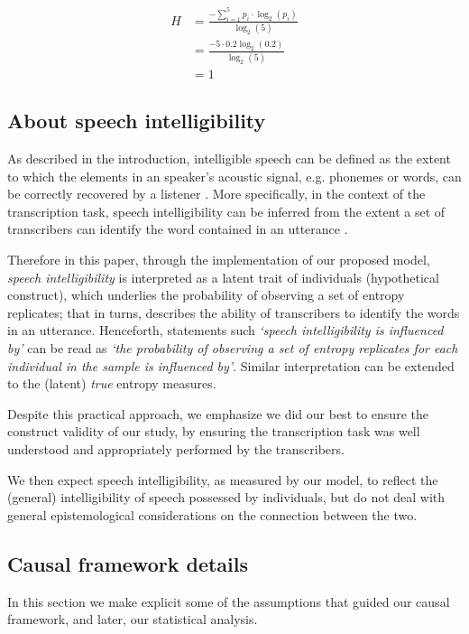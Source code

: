 %
\begin{align*}
	H &= \frac{-\sum_{i=1}^{5} p_{i} \cdot \log_{2}(p_{i})}{\log_{2}(5)} \\
	&= \frac{- 5 \cdot 0.2 \log_{2}(0.2) }{\log_{2}(5)} \\
	&= 1
\end{align*} 
%
%
\subsection{About speech intelligibility} \label{sSA:SI}
%
As described in the introduction, intelligible speech can be defined as the extent to which the elements in an speaker's acoustic signal, e.g. phonemes or words, can be correctly recovered by a listener \citep{Kent_et_al_1989, Whitehill_et_al_2004, vanHeuven_2008, Freeman_et_al_2017}. More specifically, in the context of the transcription task, speech intelligibility can be inferred from the extent a set of transcribers can identify the word contained in an utterance \cite{Boonen_et_al_2021}.

Therefore in this paper, through the implementation of our proposed model, \textit{speech intelligibility} is interpreted as a latent trait of individuals (hypothetical construct), which underlies the probability of observing a set of entropy replicates; that in turns, describes the ability of transcribers to identify the words in an utterance. Henceforth, statements such \textit{`speech intelligibility is influenced by'} can be read as \textit{`the probability of observing a set of entropy replicates for each individual in the sample is influenced by'}. Similar interpretation can be extended to the (latent) \textit{true} entropy measures.

Despite this practical approach, we emphasize we did our best to ensure the construct validity of our study, by ensuring the transcription task was well understood and appropriately performed by the transcribers.

We then expect speech intelligibility, as measured by our model, to reflect the (general) intelligibility of speech possessed by individuals, but do not deal with general epistemological considerations on the connection between the two.
%
%
\subsection{Causal framework details} \label{sSA:causal_details}
%
In this section we make explicit some of the assumptions that guided our causal framework, and later, our statistical analysis.

